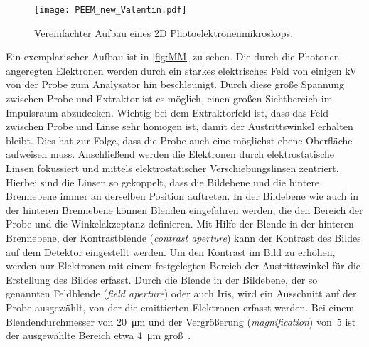         \begin{figure}
            \centering
            \texttt{[image: PEEM\_new\_Valentin.pdf]}
            \caption{Vereinfachter Aufbau eines 2D Photoelektronenmikroskops.} 
            \label{fig:MM}
        \end{figure}
        Ein exemplarischer Aufbau ist in \autoref{fig:MM} zu sehen.
        Die durch die Photonen angeregten Elektronen werden durch ein starkes elektrisches Feld von einigen \si{\kilo\volt} von der Probe zum Analysator hin beschleunigt.
        Durch diese große Spannung zwischen Probe und Extraktor ist es möglich, einen großen Sichtbereich im Impulsraum abzudecken.
        Wichtig bei dem Extraktorfeld ist, dass das Feld zwischen Probe und Linse sehr homogen ist, damit der Austrittswinkel erhalten bleibt.
        Dies hat zur Folge, dass die Probe auch eine möglichst ebene Oberfläche aufweisen muss.
        Anschließend werden die Elektronen durch elektrostatische Linsen fokussiert und mittels elektrostatischer Verschiebungslinsen zentriert.
        Hierbei sind die Linsen so gekoppelt, dass die Bildebene und die hintere Brennebene immer an derselben Position auftreten.
        In der Bildebene wie auch in der hinteren Brennebene können Blenden eingefahren werden, die den Bereich der Probe und die Winkelakzeptanz definieren.
        Mit Hilfe der Blende in der hinteren Brennebene, der Kontrastblende (\textit{contrast aperture}) kann der Kontrast des Bildes auf dem Detektor eingestellt werden.
        Um den Kontrast im Bild zu erhöhen, werden nur Elektronen mit einem festgelegten Bereich der Austrittswinkel für die Erstellung des Bildes erfasst.
        Durch die Blende in der Bildebene, der so genannten Feldblende (\textit{field aperture}) oder auch Iris, wird ein Ausschnitt auf der Probe ausgewählt, von der die emittierten Elektronen erfasst werden.
        Bei einem Blendendurchmesser von \SI{20}{\micro\meter} und der Vergrößerung (\textit{magnification}) von~\num{5} ist der ausgewählte Bereich etwa \SI{4}{\micro\meter} groß~\cite{SPECS-MM}.

